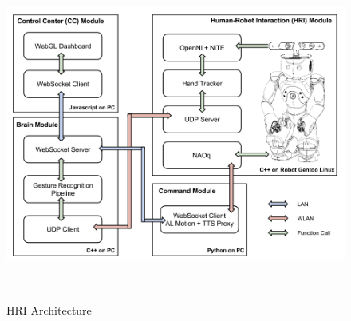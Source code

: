 \begin{figure}
	[h] \centering 
	\includegraphics[height=11cm]{figures/content/hri-architecture.png} \caption{HRI Architecture} \label{fg:hri:architecture} 
\end{figure}
